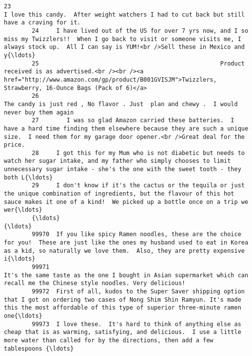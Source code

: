 \documentclass[11pt]{article}
\begin{document}
\begin{Verbatim}[commandchars=\\\{\}]
        23                                                                                                                I love this candy.  After weight watchers I had to cut back but still have a craving for it.  
        24     I have lived out of the US for over 7 yrs now, and I so miss my Twizzlers!!  When I go back to visit or someone visits me, I always stock up.  All I can say is YUM!<br />Sell these in Mexico and y{\ldots}  
        25                                                    Product received is as advertised.<br /><br /><a href="http://www.amazon.com/gp/product/B001GVISJM">Twizzlers, Strawberry, 16-Ounce Bags (Pack of 6)</a>  
        26                                                                                                                    The candy is just red , No flavor . Just  plan and chewy .  I would never buy them again  
        27        I was so glad Amazon carried these batteries.  I have a hard time finding them elsewhere because they are such a unique size.  I need them for my garage door opener.<br />Great deal for the price.  
        28     I got this for my Mum who is not diabetic but needs to watch her sugar intake, and my father who simply chooses to limit unnecessary sugar intake - she's the one with the sweet tooth - they both L{\ldots}  
        29     I don't know if it's the cactus or the tequila or just the unique combination of ingredients, but the flavour of this hot sauce makes it one of a kind!  We picked up a bottle once on a trip we wer{\ldots}  
        {\ldots}                                                                                                                                                                                                        {\ldots}  
        99970  If you like spicy Ramen noodles, these are the choice for you!  These are just like the ones my husband used to eat in Korea as a kid, so naturally we love them.  Also, they are pretty expensive i{\ldots}  
        99971                                                                              It's the same taste as the one I bought in Asian supermarket which can recall me the Chinese style noodles. Very delicious!  
        99972  First of all, kudos to the Super Saver shipping option that I got on ordering two cases of Nong Shim Shin Ramyun. It's made this the most affordable of this type of superior three-minute ramen one{\ldots}  
        99973  I love these.  It's hard to think of anything else as cheap that is as warming, satisfying, and delicious.  I use a little more water than called for by the directions, then add a few tablespoons {\ldots}  

\end{Verbatim}
\end{document}
